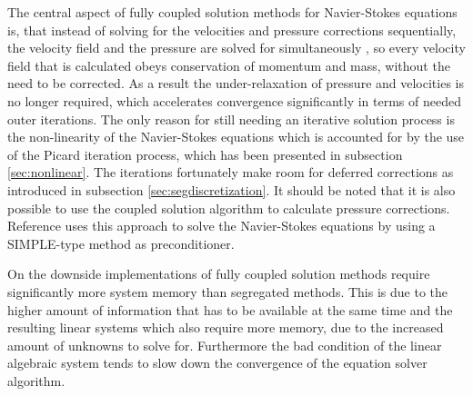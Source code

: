 The central aspect of fully coupled solution methods for Navier-Stokes equations is, that instead of solving for the velocities and pressure corrections sequentially, the velocity field and the pressure are solved for simultaneously \cite{schaefer99}, so every velocity field that is calculated obeys conservation of momentum and mass, without the need to be corrected. As a result the under-relaxation of pressure and velocities is no longer required, which accelerates convergence significantly in terms of needed outer iterations. The only reason for still needing an iterative solution process is the non-linearity of the Navier-Stokes equations which is accounted for by the use of the Picard iteration process, which has been presented in subsection \ref{sec:nonlinear}. The iterations fortunately make room for deferred corrections as introduced in subsection \ref{sec:segdiscretization}. It should be noted that it is also possible to use the coupled solution algorithm to calculate pressure corrections. Reference \cite{klaij13} uses this approach to solve the Navier-Stokes equations by using a SIMPLE-type method as preconditioner.

On the downside implementations of fully coupled solution methods require significantly more system memory than segregated methods. This is due to the higher amount of information that has to be available at the same time and the resulting linear systems which also require more memory, due to the increased amount of unknowns to solve for. Furthermore the bad condition of the linear algebraic system \cite{schaefer99} tends to slow down the convergence of the equation solver algorithm.

